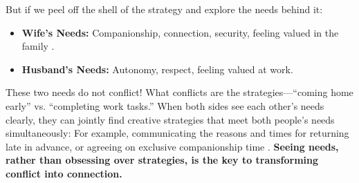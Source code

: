 But if we peel off the shell of the strategy and explore the needs behind
it:
\begin{itemize}
    \item \textbf{Wife's Needs:} Companionship, connection, security,
    feeling valued in the family \citep{cohen2001}.
    \item \textbf{Husband's Needs:} Autonomy, respect, feeling valued at
    work.
\end{itemize}

These two needs do not conflict!
What conflicts are the strategies---``coming home early'' vs. ``completing
work tasks.''
When both sides see each other's needs clearly, they can jointly find
creative strategies that meet both people's needs simultaneously:
For example, communicating the reasons and times for returning late in
advance, or agreeing on exclusive companionship time \citep{greene1998}.
\textbf{Seeing needs, rather than obsessing over strategies, is the key to
transforming conflict into connection.}

